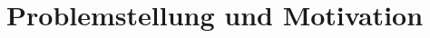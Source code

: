 \documentclass[final, english, ngerman, a4paper, 12pt, %
numbers=noenddot,
cd=true,
cdfont=false,cdfont=nohead,cdfont=nodin,
cdmath=false,
cdhead=false,
cdfoot=true,
cdcover=monochrome,
cdgeometry=symmetric,
declaration=heading,
declaration=notoc,
abstract=heading,
]{tudscrreprt}
\begin{document}

\maketitle[cdfont=false]




%
%
%
%
%
%
%
%
%
%
%
%
%


\clearpage
\setcounter{page}{1}
\setcounter{chapter}{1}










\section*{Problemstellung und Motivation}
\end{document}
